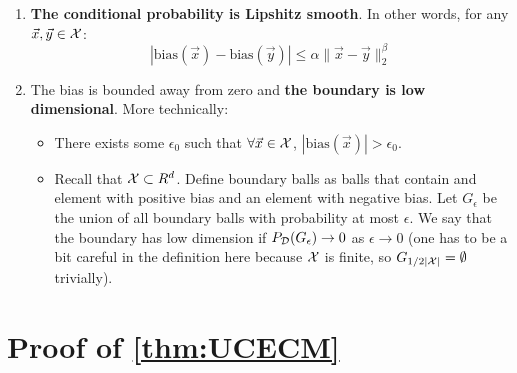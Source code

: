 \documentclass{article}
\newcommand{\X}{{\cal X}}
\newcommand{\D}{{\cal D}}
\newcommand{\x}{\vec{x}}
\newcommand{\y}{\vec{y}}
\newcommand{\bias}{\text{bias}}
\newcommand{\comment}[3]{\marginpar{\textcolor{#2}{#1: #3}}}
\newcommand{\shay}[1]{\comment{Shay}{red}{#1}}
\begin{document}
\begin{enumerate}
\item
  {\bf The conditional probability is Lipshitz smooth}. In other words, for
any $\x,\y \in \X$:
\[
|\bias(\x) - \bias(\y)| \leq \alpha \|\x-\y\|_2^{\beta}
\]
\shay{This condition seems relevant only when the specialists ``behave like balls'' }
\item
The bias is bounded away from zero and {\bf the boundary is low
dimensional}. More technically:
\begin{itemize}
\item There exists some $\epsilon_0$ such that $\forall \x \in \X$, $|\bias(\x)|>\epsilon_0$.
\item Recall that $\X \subset R^d$. Define boundary balls as balls
  that contain and element with positive bias and an element with
  negative bias. Let $G_{\epsilon}$ be the union of all boundary balls
  with probability at most $\epsilon$. We say that the boundary has
  low dimension if $P_{\D}(G_{\epsilon}) \to 0$ as $\epsilon \to 0$
  (one has to be a bit careful in the definition here because $\X$ is finite, so
  $G_{1/2|\X|}=\emptyset$ trivially).  
  \shay{It seems these definitions make more sense for infinite domains.
  I suggest that we assume an infinite domain and reduce to the transductive finite setting
  in our proofs.}
\end{itemize}
\end{enumerate}

\appendix

\section{Proof of \ref{thm:UCECM}}
\end{document}
